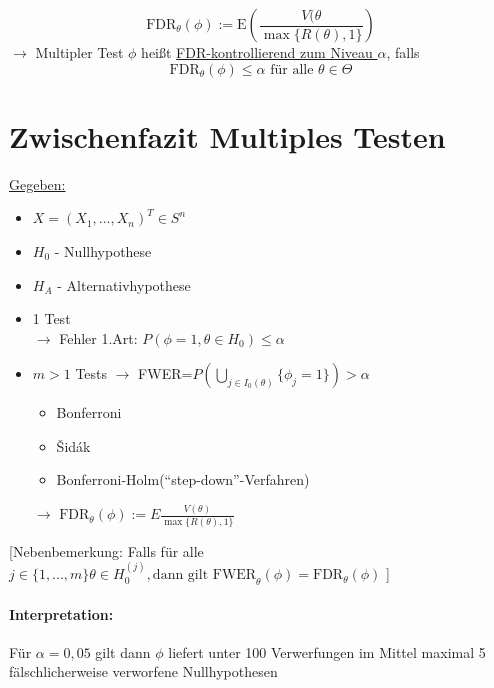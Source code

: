 \documentclass[10pt]{report}
\theoremstyle{definition}
\begin{document}
\[ \text{FDR}_{\theta}(\phi) := \text{E} \left( \frac{V(\theta}{\max\{R(\theta),1\}}\right) \]
$\rightarrow$ Multipler Test $\phi$ heißt \underline{FDR-kontrollierend zum Niveau $\alpha$}, falls
\[ \text{FDR}_{\theta}(\phi) \leq \alpha \text{ für alle } \theta \in \Theta \]


\section{Zwischenfazit Multiples Testen}
\underline{Gegeben:} 
\begin{itemize}
 \item $X=(X_1,...,X_n)^T \in S^n$
 \item $H_0$ - Nullhypothese
 \item $H_A$ - Alternativhypothese
 \item 1 Test \\ $\rightarrow$ Fehler 1.Art: $P(\phi=1,\theta \in H_0) \leq \alpha$
 \item $m > 1$ Tests $\rightarrow$ FWER=$P \left(\bigcup_{j \in I_0(\theta)} \{ \phi_j = 1 \} \right) > \alpha$
 \begin{itemize}
  \item Bonferroni
  \item \v Sid\'ak
  \item Bonferroni-Holm(``step-down''-Verfahren)
 \end{itemize}
 $\rightarrow \text{ FDR}_{\theta}(\phi) := E \frac{V(\theta)}{\max\{R(\theta),1\}}$
\end{itemize}
[Nebenbemerkung: Falls für alle $j \in  \{1,...,m\} \theta \in H_0^{(j)}, \text{dann gilt FWER}_{\theta}(\phi)=\text{FDR}_{\theta}(\phi)$ ]
\paragraph{Interpretation:}
Für $\alpha=0,05$ gilt dann $\phi$ liefert unter 100 Verwerfungen im Mittel maximal 5 fälschlicherweise verworfene Nullhypothesen
\end{document}
